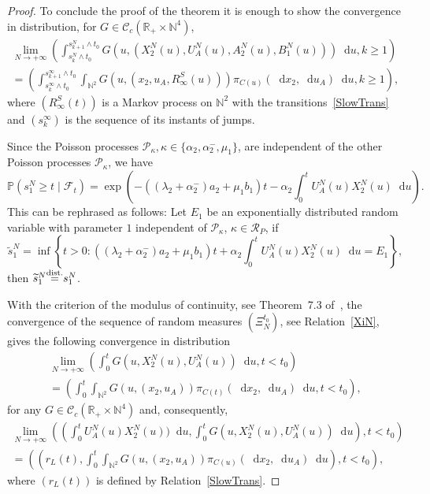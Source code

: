 \documentclass[english]{amsart}
\newcommand{\N}{\ensuremath{\mathbb{N}}}
\newcommand{\R}{\ensuremath{\mathbb{R}}}
\renewcommand{\P}{\ensuremath{\mathbb{P}}}
\newcommand{\diff}{\mathop{}\mathopen{}\mathrm{d}}
\newcommand{\cal}[1]{\ensuremath{\mathcal{#1}}}
\newcommand\steq[1]{\stackrel{\text{\rm #1.}}{=}}
\numberwithin{proposition}{section}
\begin{document}
\begin{proof}
To conclude the proof of the theorem it is enough to show the convergence in distribution, for $G{\in}{\cal C}_c(\R_+{\times}\N^4)$, 
\begin{multline}\label{SReq0}
  \lim_{N\to+\infty} \left(\int_{s_k^N{\wedge}t_0}^{s_{k+1}^N{\wedge}t_0} G(u,(X_2^N(u),U_A^N(u), A_2^N(u),B_1^N(u)))\diff u, k{\ge}1\right)\\
  =  \left(\int_{s_k^\infty{\wedge}t_0}^{s_{k+1}^\infty{\wedge}t_0}\int_{\N^2} G(u,(x_2,u_A,R^S_\infty(u)))\pi_{C(u)}(\diff x_2,\diff u_A)\diff u,k{\ge}1\right),
\end{multline}
where $(R^S_\infty(t))$ is a Markov process on $\N^2$ with the transitions~\eqref{SlowTrans} and $(s_k^\infty)$ is the sequence of its instants of jumps.  

Since the Poisson processes ${\cal P}_{\kappa},\kappa{\in}\{\alpha_2,\alpha_2^-,\mu_1\}$, are independent of the other Poisson processes ${\cal P}_\kappa$, we have
  \[
  \P\left(s_1^N{\ge}t \mid {\cal F}_t\right)=
  \exp\left(-((\lambda_2+\alpha_2^-)a_2{+}\mu_1b_1)t-\alpha_2\int_0^t U_A^N(u)X_2^N(u)\diff u\right).
  \]
  This can be rephrased as follows: Let $E_1$ be an exponentially distributed random variable with parameter $1$ independent of ${\cal P}_\kappa$, $\kappa{\in}{\cal R}_P$, if
  \[
 \widetilde{s}_1^N=\inf\left\{t{>}0: ((\lambda_2+\alpha_2^-)a_2{+}\mu_1b_1)t{+}\alpha_2\int_0^t U_A^N(u)X_2^N(u)\diff u=E_1\right\},
  \]
  then $\widetilde{s}_1^N{\steq{dist}}s_1^N$. 

With the criterion of the modulus of continuity, see Theorem~7.3 of~\citet{Billingsley}, the convergence of the sequence of random measures $(\Xi_N^{t_0})$, see Relation~\eqref{XiN},  gives the following convergence in distribution 
\begin{multline*}
  \lim_{N\to+\infty}  \left(\int_0^{t} G(u,X_2^N(u), U_A^N(u))\diff u,t{<}t_0\right)
  \\=\left(\int_0^{t}\int_{\N^2} G(u,(x_2, u_A))\pi_{C(t)}(\diff x_2, \diff u_A)\diff u,t{<}t_0\right),
\end{multline*}
  for any $G{\in}{\cal C}_c(\R_+{\times}\N^4)$ and,  consequently,
\begin{multline}\label{SReq1}
  \lim_{N\to+\infty}  \left( \left(\int_0^{t} U_A^N(u)X_2^N(u))\diff u,\int_0^{t} G(u,X_2^N(u), U_A^N(u))\diff u\right),t{<}t_0\right)
\\  =\left(\left(r_L(t),\int_0^{t}\int_{\N^2} G(u,(x_2, u_A))\pi_{C(u)}(\diff x_2, \diff u_A)\diff u\right),t{<}t_0\right),
\end{multline}
where $(r_L(t))$ is defined by Relation~\eqref{SlowTrans}. 


\end{proof}
\end{document}
